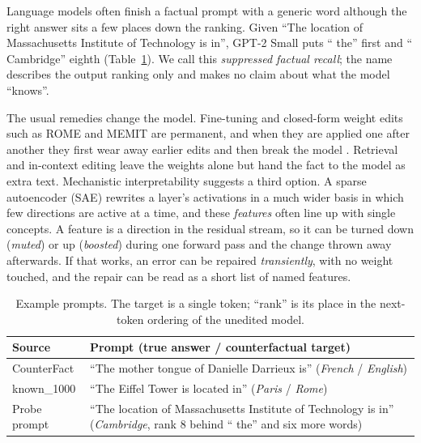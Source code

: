 \documentclass[11pt,twocolumn]{article}
\begin{document}
Language models often finish a factual prompt with a generic word although the right answer sits a few places down the ranking. Given ``The location of Massachusetts Institute of Technology is in'', GPT-2 Small \citep{radford2019} puts `` the'' first and `` Cambridge'' eighth (Table~\ref{tab:examples}). We call this \emph{suppressed factual recall}; the name describes the output ranking only and makes no claim about what the model ``knows''.

The usual remedies change the model. Fine-tuning and closed-form weight edits such as ROME \citep{meng2022} and MEMIT \citep{meng2023} are permanent, and when they are applied one after another they first wear away earlier edits and then break the model \citep{gupta2024}. Retrieval and in-context editing \citep{lewis2020,zheng2023} leave the weights alone but hand the fact to the model as extra text. Mechanistic interpretability suggests a third option. A sparse autoencoder (SAE) \citep{bricken2023,cunningham2024} rewrites a layer's activations in a much wider basis in which few directions are active at a time, and these \emph{features} often line up with single concepts. A feature is a direction in the residual stream, so it can be turned down (\emph{muted}) or up (\emph{boosted}) during one forward pass and the change thrown away afterwards. If that works, an error can be repaired \emph{transiently}, with no weight touched, and the repair can be read as a short list of named features.

\begin{table}[t]
\centering\small
\begin{tabular}{@{}p{}p{}@{}}
\toprule
\textbf{Source} & \textbf{Prompt (true answer / counterfactual target)}\\
\midrule
CounterFact & ``The mother tongue of Danielle Darrieux is'' (\textit{French} / \textit{English})\\
known\_1000 & ``The Eiffel Tower is located in'' (\textit{Paris} / \textit{Rome})\\
Probe prompt & ``The location of Massachusetts Institute of Technology is in'' (\textit{Cambridge}, rank 8 behind `` the'' and six more words)\\
\bottomrule
\end{tabular}
\caption{Example prompts. The target is a single token; ``rank'' is its place in the next-token ordering of the unedited model.}
\label{tab:examples}
\end{table}
\end{document}
